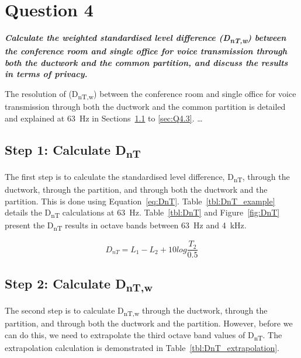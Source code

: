 \section{Question 4}

\textbf{\textit{Calculate the weighted standardised level difference (D\textsubscript{nT,w}) between the conference room and single office for voice transmission through both the ductwork and the common partition, and discuss the results in terms of privacy.}}



The resolution of (D\textsubscript{nT,w}) between the conference room and single office for voice transmission through both the ductwork and the common partition is detailed and explained at 63~Hz in Sections~\ref{sec:Q4.1} to \ref{sec:Q4.3}.
\ldots



\subsection{Step 1: Calculate D\textsubscript{nT}} \label{sec:Q4.1}

The first step is to calculate the standardised level difference, D\textsubscript{nT}, through the ductwork, through the partition, and through both the ductwork and the partition.
This is done using Equation~\ref{eq:DnT}.
Table~\ref{tbl:DnT_example} details the D\textsubscript{nT} calculations at 63~Hz.
Table~\ref{tbl:DnT} and Figure~\ref{fig:DnT} present the D\textsubscript{nT} results in octave bands between 63~Hz and 4~kHz.

	\begin{equation}\label{eq:DnT}
		D_{nT} = L_1 - L_2 + 10 log \frac{T_2}{0.5}
	\end{equation}









\subsection{Step 2: Calculate D\textsubscript{nT,w}} \label{sec:Q4.2}

The second step is to calculate D\textsubscript{nT,w} through the ductwork, through the partition, and through both the ductwork and the partition.
However, before we can do this, we need to extrapolate the third octave band values of D\textsubscript{nT}.
The extrapolation calculation is demonstrated in Table~\ref{tbl:DnT_extrapolation}.

